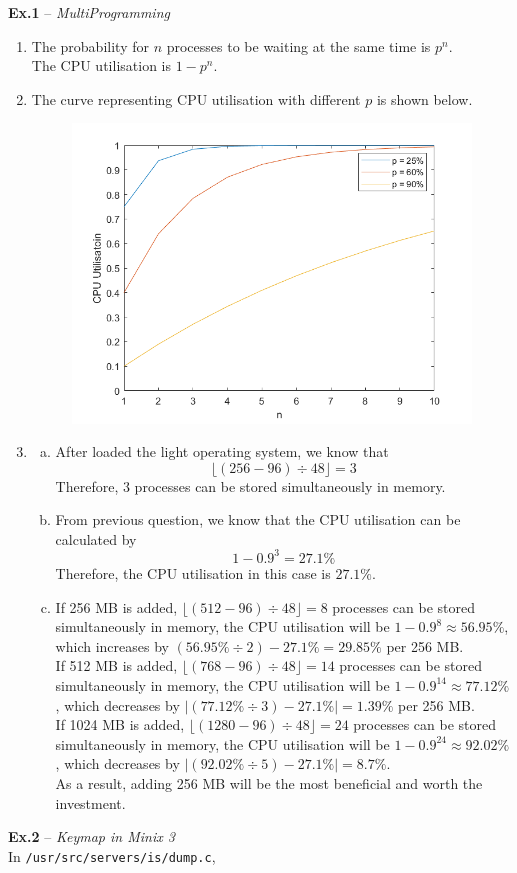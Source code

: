 \documentclass{article}
\begin{document}
\noindent\textbf{Ex.1} -- \textit{MultiProgramming}
\begin{enumerate}
\item
The probability for $n$ processes to be waiting at the same time is $p^n$. \\
The CPU utilisation is $1-p^n$.
\item
The curve representing CPU utilisation with different $p$ is shown below.
\begin{figure}[h]
\centering
\includegraphics[width=0.8\linewidth]{VE482_h2_Ex1_2.png}
\end{figure}
\item
\begin{enumerate}[a)]
\item
After loaded the light operating system, we know that
$$\lfloor (256-96)\div 48\rfloor = 3$$
Therefore, $3$ processes can be stored simultaneously in memory.
\item
From previous question, we know that the CPU utilisation can be calculated by
$$1-0.9^3=27.1\%$$
Therefore, the CPU utilisation in this case is $27.1\%$.
\item
If 256 MB is added, $\lfloor (512-96)\div 48\rfloor = 8$ processes can be stored simultaneously in memory, the CPU utilisation will be $1-0.9^8\approx56.95\%$, which increases by $(56.95\% \div 2)-27.1\% =29.85\%$ per 256 MB.\\
If 512 MB is added, $\lfloor (768-96)\div 48\rfloor = 14$ processes can be stored simultaneously in memory, the CPU utilisation will be $1-0.9^14\approx77.12\%$, which decreases by $\vert(77.12\% \div 3)-27.1\%\vert =1.39\%$ per 256 MB.\\
If 1024 MB is added, $\lfloor (1280-96)\div 48\rfloor = 24$ processes can be stored simultaneously in memory, the CPU utilisation will be $1-0.9^24\approx92.02\%$, which decreases by $\vert(92.02\% \div 5)-27.1\%\vert = 8.7\%$.\\
As a result, adding 256 MB will be the most beneficial and worth the investment.
\end{enumerate}
\end{enumerate}

\noindent\textbf{Ex.2} -- \textit{Keymap in Minix 3}\\
In \texttt{/usr/src/servers/is/dump.c},
\end{document}
